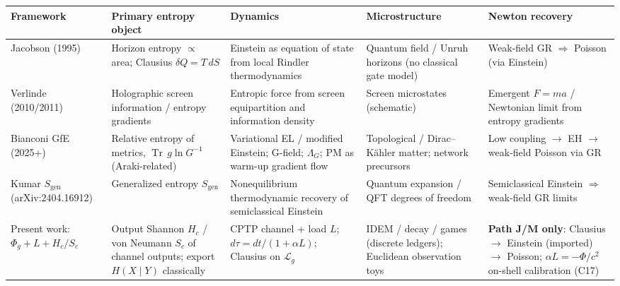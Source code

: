 \documentclass[
  11pt,
]{article}
\newcounter{none} %
\begin{document}
{\def\LTcaptype{none} %
\begin{longtable}[]{@{}
  >{\raggedright\arraybackslash}p{}
  >{\raggedright\arraybackslash}p{}
  >{\raggedright\arraybackslash}p{}
  >{\raggedright\arraybackslash}p{}
  >{\raggedright\arraybackslash}p{}@{}}
\toprule\noalign{}
\begin{minipage}[b]{\linewidth}\raggedright
Framework
\end{minipage} & \begin{minipage}[b]{\linewidth}\raggedright
Primary entropy object
\end{minipage} & \begin{minipage}[b]{\linewidth}\raggedright
Dynamics
\end{minipage} & \begin{minipage}[b]{\linewidth}\raggedright
Microstructure
\end{minipage} & \begin{minipage}[b]{\linewidth}\raggedright
Newton recovery
\end{minipage} \\
\midrule\noalign{}
\endhead
\bottomrule\noalign{}
\endlastfoot
Jacobson (1995) & Horizon entropy \(\propto\) area; Clausius
\(\delta Q=T\,dS\) & Einstein as equation of state from local Rindler
thermodynamics & Quantum field / Unruh horizons (no classical gate
model) & Weak-field GR \(\Rightarrow\) Poisson (via Einstein) \\
Verlinde (2010/2011) & Holographic screen information / entropy
gradients & Entropic force from screen equipartition and information
density & Screen microstates (schematic) & Emergent \(F=ma\) / Newtonian
limit from entropy gradients \\
Bianconi GfE (2025+) & Relative entropy of metrics,
\(\operatorname{Tr}\,g\ln G^{-1}\) (Araki-related) & Variational EL /
modified Einstein; G-field; \(\Lambda_G\); PM as warm-up gradient flow &
Topological / Dirac--Kähler matter; network precursors & Low coupling
\(\to\) EH \(\to\) weak-field Poisson via GR \\
Kumar \(S_{\mathrm{gen}}\) (arXiv:2404.16912) & Generalized entropy
\(S_{\mathrm{gen}}\) & Nonequilibrium thermodynamic recovery of
semiclassical Einstein & Quantum expansion / QFT degrees of freedom &
Semiclassical Einstein \(\Rightarrow\) weak-field GR limits \\
Present work: \(\Phi_g + L + H_c/S_c\) & Output Shannon \(H_c\) / von
Neumann \(S_c\) of channel outputs; export \(H(X\mid Y)\) classically &
CPTP channel + load \(L\); \(d\tau=dt/(1+\alpha L)\); Clausius on
\(\mathcal{L}_g\) & IDEM / decay / games (discrete ledgers); Euclidean
observation toys & \textbf{Path J/M only}: Clausius \(\to\) Einstein
(imported) \(\to\) Poisson; \(\alpha L=-\Phi/c^2\) on-shell
calibration (C17) \\
\end{longtable}
}
\end{document}
